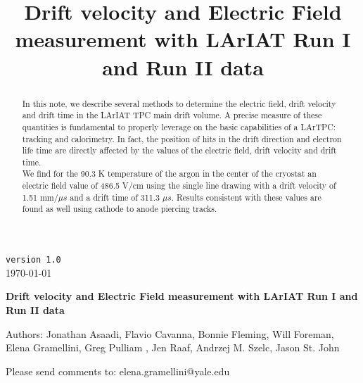 \documentclass[a4paper]{article}
\title{Drift velocity and Electric Field measurement with LArIAT Run I and Run II data}
\begin{document}
\def\Journal#1#2#3#4{{#1} {\bf #2}, #3 (#4)}
\def\etal{{\it et\ al.}}
\def\numunue{\nu_\mu\rightarrow\nu_e}
\def\numunutau{\nu_\mu\rightarrow\nu_\tau}
\def\nuebar{\bar\nu_e}
\def\nue{\nu_e}
\def\nutau{\nu_\tau}
\def\numubar{\bar\nu_\mu}
\def\numu{\nu_\mu}
\def\ra{\rightarrow}
\def\numubarnuebar{\bar\nu_\mu\rightarrow\bar\nu_e}
\def\nuebarnumubar{\bar\nu_e\rightarrow\bar\nu_\mu}
\def\osc{\rightsquigarrow}
\def\inteni{{\cal I}_{pot}}
\def\fmerit{{\cal F}}
\begin{flushright}
{\tt version 1.0}\\ 
\today
\end{flushright}
\vspace*{0.6cm}
\linenumbers
\begin{center}
{\Large \bf Drift velocity and Electric Field measurement with LArIAT Run I and Run II data} 
\vspace*{1.6cm}
\setcounter{footnote}{0}  
\def\A{\kern+.6ex\lower.42ex\hbox{$\scriptstyle \iota$}\kern-1.20ex a}
\def\E{\kern+.5ex\lower.42ex\hbox{$\scriptstyle \iota$}\kern-1.10ex e}
\small
\newcommand{\Aname}[2]{#1}
\def\titlefoot#1{\vspace{-0.3cm}\begin{center}{\bf #1}\end{center}}

Authors: Jonathan Asaadi, Flavio Cavanna, Bonnie Fleming, Will Foreman, Elena Gramellini,  Greg Pulliam , Jen Raaf, Andrzej M. Szelc,   Jason St. John\\

\end{center}
\vspace*{1cm}

\noindent Please send comments to: elena.gramellini@yale.edu


\begin{abstract}
In this note, we describe several methods to determine the electric field, drift velocity and drift time in the LArIAT TPC main drift volume. 
A precise measure of these quantities is fundamental to properly leverage on the basic capabilities of a LArTPC: tracking and calorimetry. In fact, the position of hits in the drift direction and electron life time are directly affected by the values of the electric field, drift velocity and drift time.\\

We find for the 90.3 K temperature of the argon in the center of the cryostat an electric field value of 486.5 V/cm using the single line drawing with a drift velocity of 1.51 mm/$\mu s$ and a drift time of 311.3 $\mu s$. Results consistent with these values are found as well using cathode to anode piercing tracks.

\end{abstract} 
\end{document}
